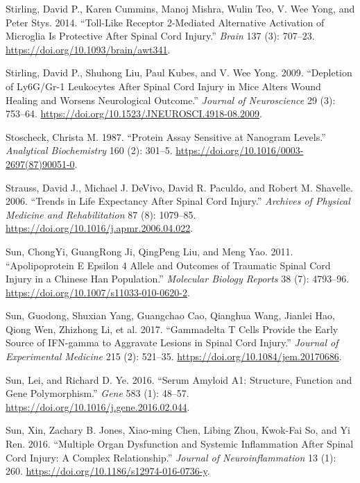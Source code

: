 \documentclass[9pt,lineno]{elife}
\newlength{\cslhangindent}
\newlength{\cslentryspacingunit} %
\newenvironment{CSLReferences}[2] %
 {%
  \setlength{\parindent}{0pt}
  \ifodd #1
  \let\oldpar\par
  \def\par{\hangindent=\cslhangindent\oldpar}
  \fi
  \setlength{\parskip}{#2\cslentryspacingunit}
 }%
 {}
\begin{document}
\begin{CSLReferences}{1}{0}
\leavevmode{}%
Stirling, David P., Karen Cummins, Manoj Mishra, Wulin Teo, V. Wee Yong, and Peter Stys. 2014. {``Toll-Like Receptor 2-Mediated Alternative Activation of Microglia Is Protective After Spinal Cord Injury.''} \emph{Brain} 137 (3): 707--23. \url{https://doi.org/10.1093/brain/awt341}.

\leavevmode{}%
Stirling, David P., Shuhong Liu, Paul Kubes, and V. Wee Yong. 2009. {``Depletion of {Ly6G}/{Gr-1 Leukocytes} After {Spinal Cord Injury} in {Mice Alters Wound Healing} and {Worsens Neurological Outcome}.''} \emph{Journal of Neuroscience} 29 (3): 753--64. \url{https://doi.org/10.1523/JNEUROSCI.4918-08.2009}.

\leavevmode{}%
Stoscheck, Christa M. 1987. {``Protein Assay Sensitive at Nanogram Levels.''} \emph{Analytical Biochemistry} 160 (2): 301--5. \url{https://doi.org/10.1016/0003-2697(87)90051-0}.

\leavevmode{}%
Strauss, David J., Michael J. DeVivo, David R. Paculdo, and Robert M. Shavelle. 2006. {``Trends in {Life Expectancy After Spinal Cord Injury}.''} \emph{Archives of Physical Medicine and Rehabilitation} 87 (8): 1079--85. \url{https://doi.org/10.1016/j.apmr.2006.04.022}.

\leavevmode{}%
Sun, ChongYi, GuangRong Ji, QingPeng Liu, and Meng Yao. 2011. {``Apolipoprotein {E} Epsilon 4 Allele and Outcomes of Traumatic Spinal Cord Injury in a {Chinese Han} Population.''} \emph{Molecular Biology Reports} 38 (7): 4793--96. \url{https://doi.org/10.1007/s11033-010-0620-2}.

\leavevmode{}%
Sun, Guodong, Shuxian Yang, Guangchao Cao, Qianghua Wang, Jianlei Hao, Qiong Wen, Zhizhong Li, et al. 2017. {``Gammadelta {T} Cells Provide the Early Source of {IFN-gamma} to Aggravate Lesions in Spinal Cord Injury.''} \emph{Journal of Experimental Medicine} 215 (2): 521--35. \url{https://doi.org/10.1084/jem.20170686}.

\leavevmode{}%
Sun, Lei, and Richard D. Ye. 2016. {``Serum Amyloid {A1}: {Structure}, Function and Gene Polymorphism.''} \emph{Gene} 583 (1): 48--57. \url{https://doi.org/10.1016/j.gene.2016.02.044}.

\leavevmode{}%
Sun, Xin, Zachary B. Jones, Xiao-ming Chen, Libing Zhou, Kwok-Fai So, and Yi Ren. 2016. {``Multiple Organ Dysfunction and Systemic Inflammation After Spinal Cord Injury: A Complex Relationship.''} \emph{Journal of Neuroinflammation} 13 (1): 260. \url{https://doi.org/10.1186/s12974-016-0736-y}.


\end{CSLReferences}
\end{document}
